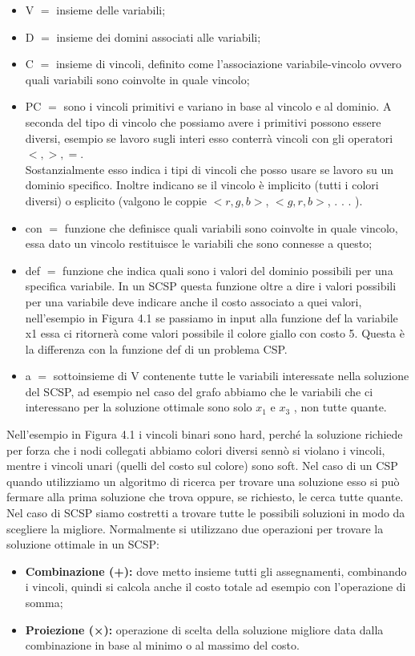 \begin{itemize}
    \item V $=$ insieme delle variabili;
    \item D $=$ insieme dei domini associati alle variabili;
    \item C $=$ insieme di vincoli, definito come l’associazione variabile-vincolo ovvero quali variabili sono coinvolte in quale vincolo;
    \item PC $=$ sono i vincoli primitivi e variano in base al vincolo e al dominio. A seconda del tipo di vincolo che possiamo avere i primitivi possono essere diversi, esempio se lavoro sugli interi esso conterrà vincoli con gli operatori $<,>,=$.
    \\Sostanzialmente esso indica i tipi di vincoli che posso usare se lavoro su un dominio specifico. Inoltre indicano se il vincolo è implicito (tutti i colori diversi) o esplicito (valgono le coppie $<r,g,b>$, $<g,r,b>$, . . . ).
    \item con $=$ funzione che definisce quali variabili sono coinvolte in quale vincolo, essa dato un vincolo restituisce le variabili che sono connesse a questo;
    \item def $=$ funzione che indica quali sono i valori del dominio possibili per una specifica variabile. In un SCSP questa funzione oltre a dire i valori possibili per una variabile deve indicare anche il costo associato a quei valori, nell’esempio in Figura 4.1 se passiamo in input alla funzione def la variabile x1 essa ci ritornerà come valori possibile il colore giallo con costo 5. Questa è la differenza con la funzione def di un problema CSP.
    \item a $=$ sottoinsieme di V contenente tutte le variabili interessate nella soluzione del SCSP, ad esempio nel caso del grafo abbiamo che le variabili che ci interessano per la soluzione ottimale sono solo $x_1$ e $x_3$ , non tutte quante.
\end{itemize}
Nell’esempio in Figura 4.1 i vincoli binari sono hard, perché la soluzione richiede per forza che i nodi collegati abbiamo colori diversi sennò si violano i vincoli, mentre i vincoli unari (quelli del costo sul colore) sono soft. Nel caso di un CSP quando utilizziamo un algoritmo di ricerca per trovare una soluzione esso si può fermare alla prima soluzione che trova oppure, se richiesto, le cerca tutte quante. Nel caso di SCSP siamo costretti a trovare tutte le possibili soluzioni in modo da scegliere la
migliore. Normalmente si utilizzano due operazioni per trovare la soluzione ottimale in un SCSP:
\begin{itemize}
    \item \textbf{Combinazione (+):} dove metto insieme tutti gli assegnamenti, combinando i vincoli, quindi si calcola anche il costo totale ad esempio con l’operazione di somma;
    \item \textbf{Proiezione (×):} operazione di scelta della soluzione migliore data dalla combinazione in base al minimo o al massimo del costo.
\end{itemize}

